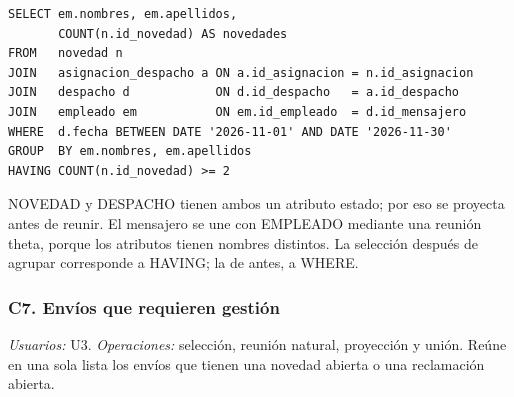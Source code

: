 \begin{center}\end{center}

\begin{lstlisting}[style=sqlpro]
SELECT em.nombres, em.apellidos,
       COUNT(n.id_novedad) AS novedades
FROM   novedad n
JOIN   asignacion_despacho a ON a.id_asignacion = n.id_asignacion
JOIN   despacho d            ON d.id_despacho   = a.id_despacho
JOIN   empleado em           ON em.id_empleado  = d.id_mensajero
WHERE  d.fecha BETWEEN DATE '2026-11-01' AND DATE '2026-11-30'
GROUP  BY em.nombres, em.apellidos
HAVING COUNT(n.id_novedad) >= 2
\end{lstlisting}
NOVEDAD y DESPACHO tienen ambos un atributo estado; por eso se proyecta antes de reunir. El mensajero se une con EMPLEADO mediante una reunión theta, porque los atributos tienen nombres distintos. La selección después de agrupar corresponde a HAVING; la de antes, a WHERE.


\subsubsection{C7. Envíos que requieren gestión}
\label{q:C7}
\textit{Usuarios:} U3. \textit{Operaciones:} selección, reunión natural, proyección y unión. Reúne en una sola lista los envíos que tienen una novedad abierta o una reclamación abierta.

\begin{center}\end{center}

